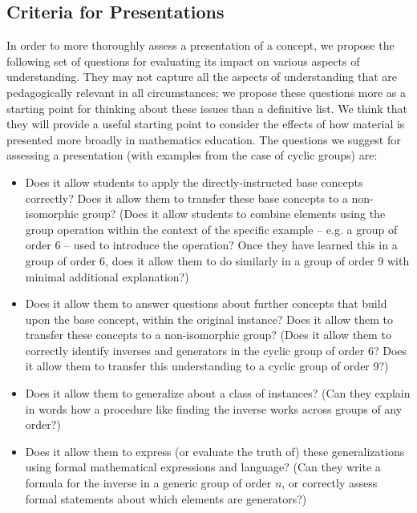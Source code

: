 \documentclass[man,10pt]{apa6}
\begin{document}
\subsection{Criteria for Presentations}
In order to more thoroughly assess a presentation of a concept, we propose the following set of questions for evaluating its impact on various aspects of understanding. They may not capture all the aspects of understanding that are pedagogically relevant in all circumstances; we propose these questions more as a starting point for thinking about these issues than a definitive list. We think that they will provide a useful starting point to consider the effects of how material is presented more broadly in mathematics education. The questions we suggest for assessing a presentation (with examples from the case of cyclic groups) are:
\begin{itemize}
\item Does it allow students to apply the directly-instructed base concepts correctly? Does it allow them to transfer these base concepts to a non-isomorphic group? (Does it allow students to combine elements using the group operation within the context of the specific example -- e.g. a group of order 6 -- used to introduce the operation? Once they have learned this in a group of order 6, does it allow them to do similarly in a group of order 9 with minimal additional explanation?) 
\item Does it allow them to answer questions about further concepts that build upon the base concept, within the original instance? Does it allow them to transfer these concepts to a non-isomorphic group? (Does it allow them to correctly identify inverses and generators in the cyclic group of order 6? Does it allow them to transfer this understanding to a cyclic group of order 9?)
\item Does it allow them to generalize about a class of instances? (Can they explain in words how a procedure like finding the inverse works across groups of any order?) 
\item Does it allow them to express (or evaluate the truth of) these generalizations using formal mathematical expressions and language? (Can they write a formula for the inverse in a generic group of order $n$, or correctly assess formal statements about which elements are generators?)
\end{itemize}
\end{document}
